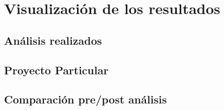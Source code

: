 \section{Visualización de los resultados}
\subsection{Análisis realizados}
\subsection{Proyecto Particular}
\subsection{Comparación pre/post análisis}
